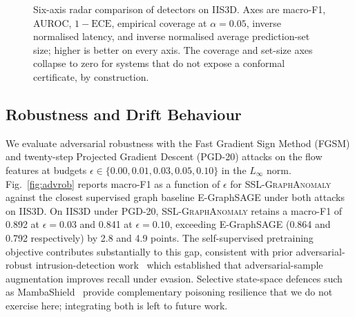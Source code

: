 \documentclass[journal,twoside]{IEEEtran}
\begin{document}
\begin{figure}[t]
{%
}%
\caption{Six-axis radar comparison of detectors on IIS3D. Axes are
macro-F1, AUROC, $1{-}\mathrm{ECE}$, empirical coverage at $\alpha = 0.05$,
inverse normalised latency, and inverse normalised average prediction-set
size; higher is better on every axis. The coverage and set-size axes
collapse to zero for systems that do not expose a conformal certificate,
by construction.}
\label{fig:radar}
\end{figure}

\subsection{Robustness and Drift Behaviour}
\label{sec:results:robustness}
We evaluate adversarial robustness with the Fast Gradient Sign Method
(FGSM) and twenty-step Projected Gradient Descent (PGD-20) attacks on the
flow features at budgets $\epsilon \in \{0.00, 0.01, 0.03, 0.05, 0.10\}$
in the $L_\infty$ norm. Fig.~\ref{fig:advrob} reports macro-F1 as a
function of $\epsilon$ for \textsc{SSL-GraphAnomaly} against the closest
supervised graph baseline E-GraphSAGE under both attacks on IIS3D. On
IIS3D under PGD-20, \textsc{SSL-GraphAnomaly} retains a macro-F1 of 0.892
at $\epsilon = 0.03$ and 0.841 at $\epsilon = 0.10$, exceeding
E-GraphSAGE (0.864 and 0.792 respectively) by 2.8 and 4.9 points. The
self-supervised pretraining objective contributes substantially to this
gap, consistent with prior adversarial-robust intrusion-detection
work~\cite{anaedevha2024robustadv} which established that
adversarial-sample augmentation improves recall under evasion. Selective
state-space defences such as MambaShield~\cite{anaedevha2025mambashield}
provide complementary poisoning resilience that we do not exercise here;
integrating both is left to future work.
\end{document}
